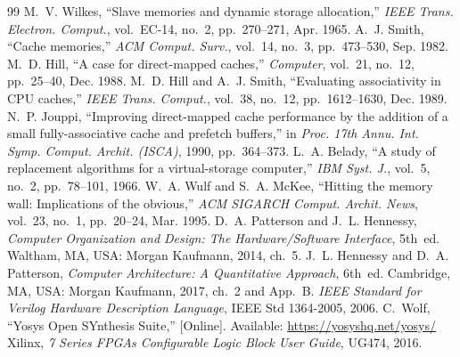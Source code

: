 \documentclass[conference]{IEEEtran}
\begin{document}
\begin{thebibliography}{99}
 M.~V. Wilkes, ``Slave memories and dynamic storage allocation,'' \emph{IEEE Trans. Electron. Comput.}, vol.~EC-14, no.~2, pp.~270--271, Apr. 1965.
 A.~J. Smith, ``Cache memories,'' \emph{ACM Comput. Surv.}, vol.~14, no.~3, pp.~473--530, Sep. 1982.
 M.~D. Hill, ``A case for direct-mapped caches,'' \emph{Computer}, vol.~21, no.~12, pp.~25--40, Dec. 1988.
 M.~D. Hill and A.~J. Smith, ``Evaluating associativity in CPU caches,'' \emph{IEEE Trans. Comput.}, vol.~38, no.~12, pp.~1612--1630, Dec. 1989.
 N.~P. Jouppi, ``Improving direct-mapped cache performance by the addition of a small fully-associative cache and prefetch buffers,'' in \emph{Proc. 17th Annu. Int. Symp. Comput. Archit. (ISCA)}, 1990, pp.~364--373.
 L.~A. Belady, ``A study of replacement algorithms for a virtual-storage computer,'' \emph{IBM Syst. J.}, vol.~5, no.~2, pp.~78--101, 1966.
 W.~A. Wulf and S.~A. McKee, ``Hitting the memory wall: Implications of the obvious,'' \emph{ACM SIGARCH Comput. Archit. News}, vol.~23, no.~1, pp.~20--24, Mar. 1995.
 D.~A. Patterson and J.~L. Hennessy, \emph{Computer Organization and Design: The Hardware/Software Interface}, 5th~ed. Waltham, MA, USA: Morgan Kaufmann, 2014, ch.~5.
 J.~L. Hennessy and D.~A. Patterson, \emph{Computer Architecture: A Quantitative Approach}, 6th~ed. Cambridge, MA, USA: Morgan Kaufmann, 2017, ch.~2 and App.~B.
 \emph{IEEE Standard for Verilog Hardware Description Language}, IEEE Std 1364-2005, 2006.
 C.~Wolf, ``Yosys Open SYnthesis Suite,'' [Online]. Available: \url{https://yosyshq.net/yosys/}
 Xilinx, \emph{7 Series FPGAs Configurable Logic Block User Guide}, UG474, 2016.
\end{thebibliography}
\end{document}
